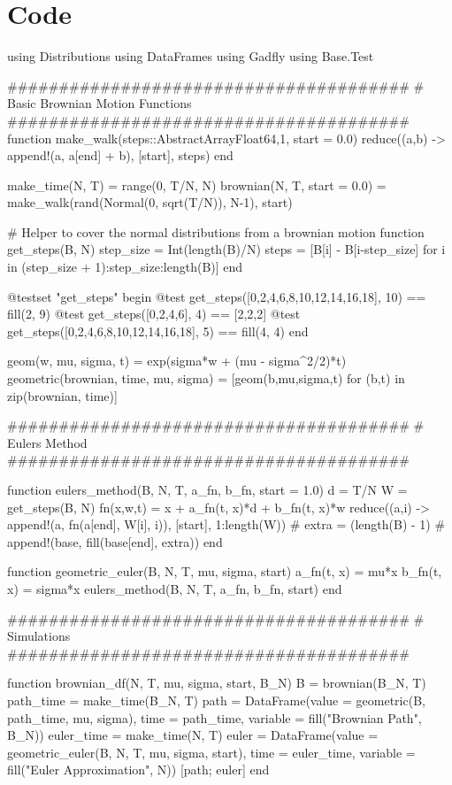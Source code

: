 \documentclass[a4paper,12pt]{article}
\begin{document}
\section*{Code}
\begin{juliacode}
using Distributions
using DataFrames
using Gadfly
using Base.Test


#######################################
# Basic Brownian Motion Functions
#######################################
function make_walk(steps::AbstractArray{Float64,1}, start = 0.0)
    reduce((a,b) -> append!(a, a[end] + b), [start], steps)
end

make_time(N, T) = range(0, T/N, N)
brownian(N, T, start = 0.0) = make_walk(rand(Normal(0, sqrt(T/N)), N-1), start)

# Helper to cover the normal distributions from a brownian motion
function get_steps(B, N)
    step_size = Int(length(B)/N)
    steps = [B[i] - B[i-step_size] for i in (step_size + 1):step_size:length(B)]
end

@testset "get_steps" begin
    @test get_steps([0,2,4,6,8,10,12,14,16,18], 10) == fill(2, 9)
    @test get_steps([0,2,4,6], 4) == [2,2,2]
    @test get_steps([0,2,4,6,8,10,12,14,16,18], 5) == fill(4, 4)
end

geom(w, mu, sigma, t) = exp(sigma*w + (mu - sigma^2/2)*t)
geometric(brownian, time, mu, sigma) = [geom(b,mu,sigma,t) for (b,t) in zip(brownian, time)]

#######################################
# Eulers Method
#######################################

function eulers_method(B, N, T, a_fn, b_fn, start = 1.0)
    d = T/N
    W = get_steps(B, N)
    fn(x,w,t) = x + a_fn(t, x)*d + b_fn(t, x)*w
    reduce((a,i) -> append!(a, fn(a[end], W[i], i)), [start], 1:length(W))
    # extra = (length(B) - 1) %
    # append!(base, fill(base[end], extra))
end

function geometric_euler(B, N, T, mu, sigma, start)
    a_fn(t, x) = mu*x
    b_fn(t, x) = sigma*x
    eulers_method(B, N, T, a_fn, b_fn, start)
end

#######################################
# Simulations
#######################################

function brownian_df(N, T, mu, sigma, start, B_N)
    B = brownian(B_N, T)
    path_time = make_time(B_N, T)
    path = DataFrame(value = geometric(B, path_time, mu, sigma),
                     time = path_time,
                     variable = fill("Brownian Path", B_N))
    euler_time = make_time(N, T)
    euler = DataFrame(value = geometric_euler(B, N, T, mu, sigma, start),
                      time = euler_time,
                      variable = fill("Euler Approximation", N))
    [path; euler]
end


\end{juliacode}
\end{document}
